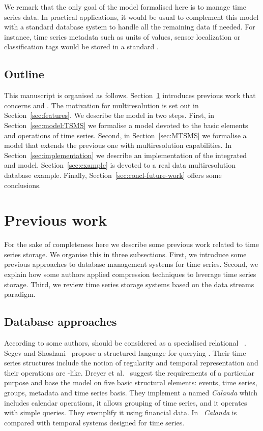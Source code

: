 We remark that the only goal of the model formalised here is to manage
time series data. In practical applications, it would be usual to
complement this model with a standard database system to handle all
the remaining data if needed. For instance, time series metadata such
as units of values, sensor localization or classification tags would
be stored in a standard .


\subsection{Outline}

This manuscript is organised as
follows. Section~\ref{sec:related-work} introduces previous work that
concerns  and .  The motivation for
multiresolution is set out in Section~\ref{sec:features}.  We describe
the model in two steps.  First, in Section~\ref{sec:model:TSMS} we
formalise a  model devoted to the basic elements and
operations of time series.  Second, in Section~\ref{sec:MTSMS} we
formalise a  model that extends the previous one with
multiresolution capabilities.  In Section~\ref{sec:implementation} we
describe an implementation of the integrated  and
 model. Section~\ref{sec:example} is devoted to a real
data multiresolution database example.  Finally,
Section~\ref{sec:concl-future-work} offers some conclusions.


\section{Previous work}
\label{sec:related-work}

For the sake of completeness here we describe some previous work
related to time series storage. We organise this in three
subsections. First, we introduce some previous approaches to database
management systems for time series. Second, we explain how some
authors applied compression techniques to leverage time series
storage. Third, we review time series storage systems based on the
data streams paradigm.


\subsection{Database approaches}

According to some authors,  should be considered as a
specialised relational ~\cite{last01}.  Segev and
Shoshani~\cite{segev87:sigmod} propose a structured language for
querying . Their time series structures include the notion
of regularity and temporal representation and their operations are
-like.  Dreyer et al.~\cite{dreyer94} suggest the
requirements of a particular purpose  and base the model on
five basic structural elements: events, time series, groups, metadata
and time series basis. They implement a  named
\emph{Calanda} which includes calendar operations, it allows grouping
of time series, and it operates with simple queries. They exemplify it
using financial data. In~\cite{schmidt95} \emph{Calanda} is compared
with temporal systems designed for time series.
 
